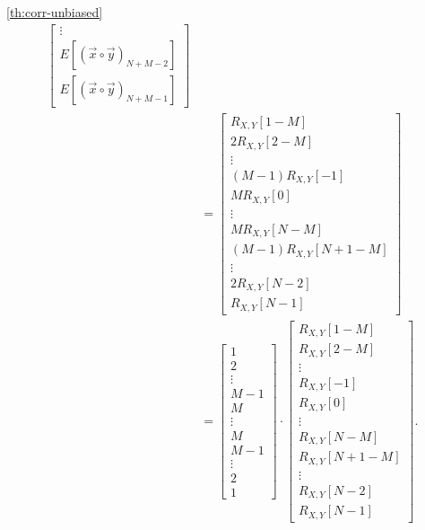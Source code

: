 \documentclass[a4paper, openany, oneside]{memoir}
\begin{document}
\begin{blockProofTheorem}{\ref{th:corr-unbiased}}
\begin{align*}
\begin{bmatrix}
            \vdots \\
            E[(\vec{x} \circ \vec{y})_{N+M-2}] \\
            E[(\vec{x} \circ \vec{y})_{N+M-1}]
        \end{bmatrix} \\
        &= \begin{bmatrix}
            R_{X,Y}[1-M] \\
            2 R_{X,Y}[2-M] \\
            \vdots \\
            (M-1) R_{X,Y}[-1] \\
            M R_{X,Y}[0] \\
            \vdots \\
            M R_{X,Y}[N-M] \\
            (M-1) R_{X,Y}[N+1-M] \\
            \vdots \\
            2 R_{X,Y}[N-2] \\
            R_{X,Y}[N-1]
        \end{bmatrix} \\
        &= \begin{bmatrix}
            1 \\
            2 \\
            \vdots \\
            M-1 \\
            M \\
            \vdots \\
            M \\
            M-1 \\
            \vdots \\
            2 \\
            1
        \end{bmatrix} \cdot \begin{bmatrix}
            R_{X,Y}[1-M] \\
            R_{X,Y}[2-M] \\
            \vdots \\
            R_{X,Y}[-1] \\
            R_{X,Y}[0] \\
            \vdots \\
            R_{X,Y}[N-M] \\
            R_{X,Y}[N+1-M] \\
            \vdots \\
            R_{X,Y}[N-2] \\
            R_{X,Y}[N-1]
        \end{bmatrix}.
    \end{align*}
\end{blockProofTheorem}
\end{document}
